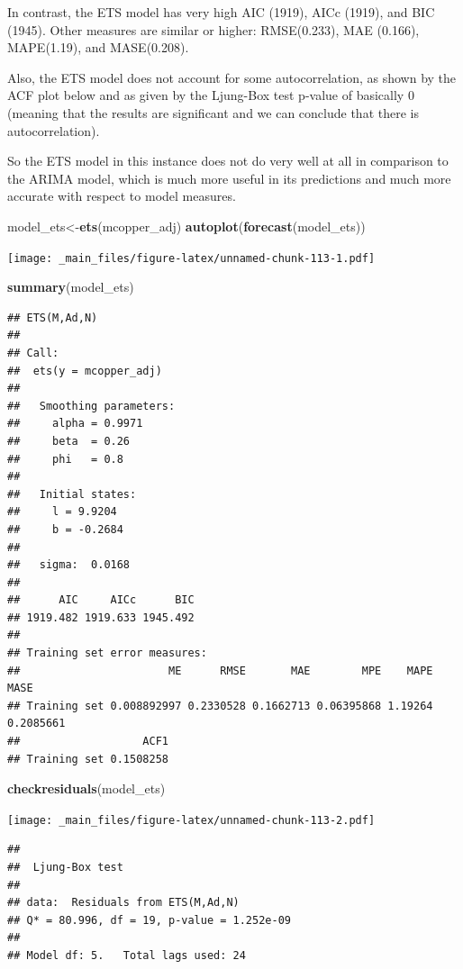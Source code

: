 \documentclass[]{book}
\newenvironment{Shaded}{\begin{snugshade}}{\end{snugshade}}
\newcommand{\KeywordTok}[1]{\textcolor[rgb]{0.13,0.29,0.53}{\textbf{#1}}}
\newcommand{\NormalTok}[1]{#1}
\begin{document}
In contrast, the ETS model has very high AIC (1919), AICc (1919), and BIC (1945). Other measures are similar or higher: RMSE(0.233), MAE (0.166), MAPE(1.19), and MASE(0.208).

Also, the ETS model does not account for some autocorrelation, as shown by the ACF plot below and as given by the Ljung-Box test p-value of basically 0 (meaning that the results are significant and we can conclude that there is autocorrelation).

So the ETS model in this instance does not do very well at all in comparison to the ARIMA model, which is much more useful in its predictions and much more accurate with respect to model measures.

\begin{Shaded}
\begin{Highlighting}[]
\NormalTok{model_ets<-}\KeywordTok{ets}\NormalTok{(mcopper_adj)}
\KeywordTok{autoplot}\NormalTok{(}\KeywordTok{forecast}\NormalTok{(model_ets))}
\end{Highlighting}
\end{Shaded}

\texttt{[image: \_main\_files/figure-latex/unnamed-chunk-113-1.pdf]}

\begin{Shaded}
\begin{Highlighting}[]
\KeywordTok{summary}\NormalTok{(model_ets)}
\end{Highlighting}
\end{Shaded}

\begin{verbatim}
## ETS(M,Ad,N) 
## 
## Call:
##  ets(y = mcopper_adj) 
## 
##   Smoothing parameters:
##     alpha = 0.9971 
##     beta  = 0.26 
##     phi   = 0.8 
## 
##   Initial states:
##     l = 9.9204 
##     b = -0.2684 
## 
##   sigma:  0.0168
## 
##      AIC     AICc      BIC 
## 1919.482 1919.633 1945.492 
## 
## Training set error measures:
##                       ME      RMSE       MAE        MPE    MAPE      MASE
## Training set 0.008892997 0.2330528 0.1662713 0.06395868 1.19264 0.2085661
##                   ACF1
## Training set 0.1508258
\end{verbatim}

\begin{Shaded}
\begin{Highlighting}[]
\KeywordTok{checkresiduals}\NormalTok{(model_ets)}
\end{Highlighting}
\end{Shaded}

\texttt{[image: \_main\_files/figure-latex/unnamed-chunk-113-2.pdf]}

\begin{verbatim}
## 
##  Ljung-Box test
## 
## data:  Residuals from ETS(M,Ad,N)
## Q* = 80.996, df = 19, p-value = 1.252e-09
## 
## Model df: 5.   Total lags used: 24
\end{verbatim}
\end{document}
